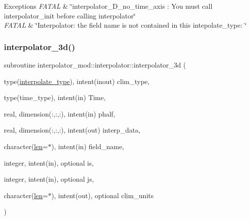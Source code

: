 \begin{DoxyExceptions}{Exceptions}
{\em F\+A\+T\+AL} & \char`\"{}interpolator\+\_\+D\+\_\+no\+\_\+time\+\_\+axis \+: You must call
                interpolator\+\_\+init before calling interpolator\char`\"{} \\
\hline
{\em F\+A\+T\+AL} & \char`\"{}\+Interpolator\+: the field name is not contained in this
                intepolate\+\_\+type\+: \char`\"{} \\
\hline
\end{DoxyExceptions}
\mbox{\label{interfaceinterpolator__mod_1_1interpolator_ad7d266557fa3f3eb86bb255494351966}} 
\subsubsection{\texorpdfstring{interpolator\+\_\+3d()}{interpolator\_3d()}}
{\footnotesize\ttfamily subroutine interpolator\+\_\+mod\+::interpolator\+::interpolator\+\_\+3d (\begin{DoxyParamCaption}\item[{type(\hyperlink{structinterpolator__mod_1_1interpolate__type}{interpolate\+\_\+type}), intent(inout)}]{clim\+\_\+type,  }\item[{type(time\+\_\+type), intent(in)}]{Time,  }\item[{real, dimension(\+:,\+:,\+:), intent(in)}]{phalf,  }\item[{real, dimension(\+:,\+:,\+:), intent(out)}]{interp\+\_\+data,  }\item[{character(\hyperlink{namespaceinterpolator__mod_a6bd2ec3395203e1b6aba0610bfbfe16b}{len}=$\ast$), intent(in)}]{field\+\_\+name,  }\item[{integer, intent(in), optional}]{is,  }\item[{integer, intent(in), optional}]{js,  }\item[{character(\hyperlink{namespaceinterpolator__mod_a6bd2ec3395203e1b6aba0610bfbfe16b}{len}=$\ast$), intent(out), optional}]{clim\+\_\+units }\end{DoxyParamCaption})\hspace{0.3cm}{\ttfamily [private]}}



